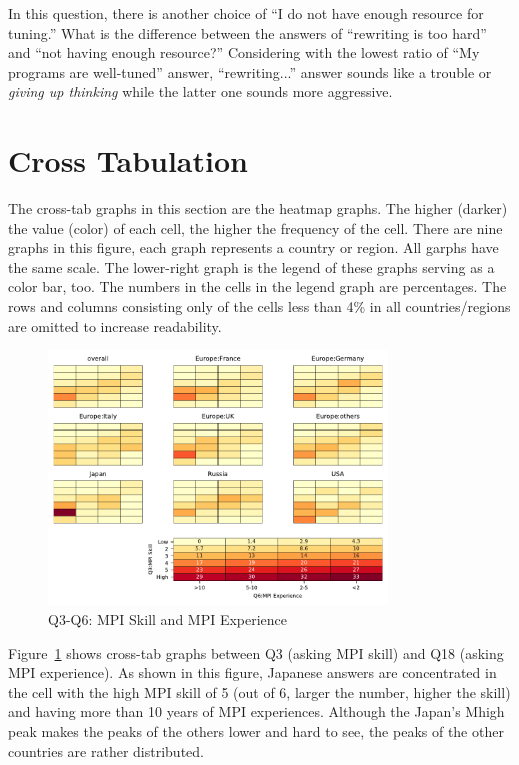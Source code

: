 \documentclass[submit,techrep,noauthor,english]{ipsj}
\begin{document}
In this question, there is another choice of ``I do not have
enough resource for tuning.'' What is the difference between the
answers of ``rewriting is too hard'' and ``not having enough
resource?'' Considering with the lowest ratio of ``My programs are
well-tuned'' answer, ``rewriting...'' answer sounds like a trouble or
{\it giving up thinking} while the latter one sounds more aggressive.

\section{Cross Tabulation}

The cross-tab graphs in this section are the heatmap graphs. The
higher (darker) the value (color) of each cell, the higher the
frequency of the cell. There are nine graphs in this figure, each
graph represents a country or region. All garphs have the same scale.
The lower-right graph is the legend of these graphs serving as a color
bar, too. The numbers in the cells in the legend graph are
percentages. The rows and columns consisting only of the cells less
than 4\% in all countries/regions are omitted to increase readability.

\begin{figure}[htb]
\begin{center}
\includegraphics[width=9cm]{../pdfs/Q3-Q6.pdf}
\caption{Q3-Q6: MPI Skill and MPI Experience}
\label{fig:q3-q6}
\end{center}
\end{figure}

Figure~\ref{fig:q3-q6} shows cross-tab graphs between
Q3 (asking MPI skill) and Q18 (asking MPI experience). As shown in
this figure, Japanese answers are concentrated in the cell with the high
MPI skill of 5 (out of 6, larger the number, higher the skill) and
having more than 10 years of MPI experiences. Although the Japan's
Mhigh peak makes the peaks of the others lower and hard to see, the
peaks of the other countries are rather distributed.  
\end{document}

